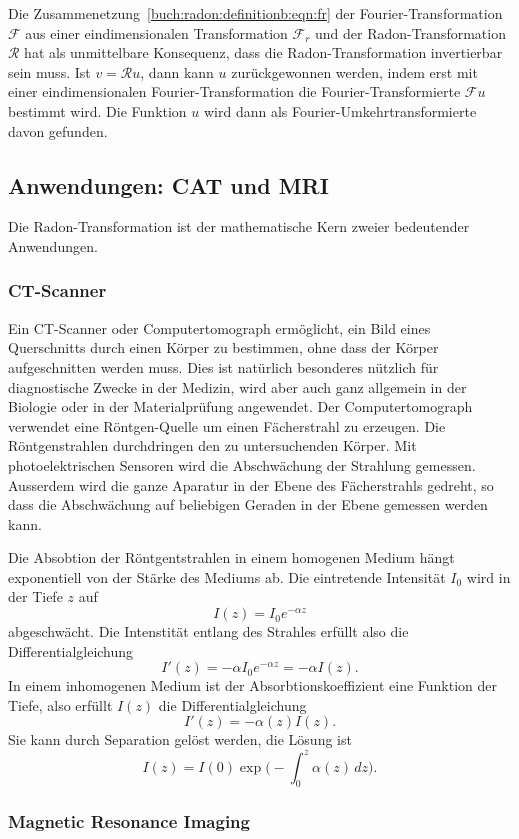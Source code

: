 Die Zusammenetzung~\eqref{buch:radon:definitionb:eqn:fr}
der Fourier-Transformation $\mathscr{F}$ aus
einer eindimensionalen Transformation $\mathscr{F}_r$ und der
Radon-Transformation $\mathscr{R}$
hat als unmittelbare Konsequenz, dass die Radon-Transformation
invertierbar sein muss.
Ist $v=\mathscr{R}u$, dann kann $u$ zurückgewonnen werden, indem
erst mit einer eindimensionalen Fourier-Transformation die
Fourier-Transformierte $\mathscr{F}u$ bestimmt wird.
Die Funktion $u$ wird dann als Fourier-Umkehrtransformierte davon
gefunden.

%
%
\subsection{Anwendungen: CAT und MRI
\label{buch:radon:definition:subsection:catmri}}
Die Radon-Transformation ist der mathematische Kern zweier bedeutender
Anwendungen.

%
%
\subsubsection{CT-Scanner}
Ein CT-Scanner oder Computertomograph ermöglicht, ein Bild eines
Querschnitts durch einen Körper zu bestimmen, ohne dass der Körper
aufgeschnitten werden muss.
Dies ist natürlich besonderes nützlich für diagnostische Zwecke in der
Medizin, wird aber auch ganz allgemein in der Biologie oder in der
Materialprüfung angewendet.
Der Computertomograph verwendet eine Röntgen-Quelle um einen Fächerstrahl
zu erzeugen.
Die Röntgenstrahlen durchdringen den zu untersuchenden Körper.
Mit photoelektrischen Sensoren wird die Abschwächung der Strahlung
gemessen.
Ausserdem wird die ganze Aparatur in der Ebene des Fächerstrahls
gedreht, so dass die Abschwächung auf beliebigen Geraden in der
Ebene gemessen werden kann.

Die Absobtion der Röntgentstrahlen in einem homogenen Medium 
hängt exponentiell von der Stärke des Mediums ab.
Die eintretende Intensität $I_0$ wird in der Tiefe $z$ auf
\[
I(z) = I_0e^{-\alpha z}
\]
abgeschwächt.
Die Intenstität entlang des Strahles erfüllt also die Differentialgleichung
\[
I'(z)
=
-\alpha I_0 e^{-\alpha z}
=
-\alpha I(z).
\]
In einem inhomogenen Medium ist der Absorbtionskoeffizient eine Funktion
der Tiefe, also erfüllt $I(z)$ die Differentialgleichung
\[
I'(z) = -\alpha(z) I(z).
\]
Sie kann durch Separation gelöst werden, die Lösung ist
\[
I(z) = I(0) \exp\biggl(-\int_0^z \alpha(z)\,dz\biggr).
\]


%
%
\subsubsection{Magnetic Resonance Imaging}






